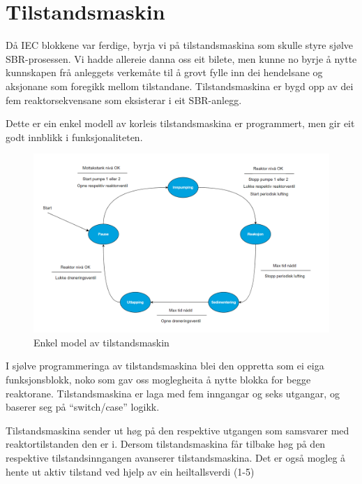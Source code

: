 \section{Tilstandsmaskin}
\thispagestyle{fancy}

Då \gls{IEC} blokkene var ferdige, byrja vi på tilstandsmaskina som skulle styre sjølve \gls{SBR}-prosessen. 
Vi hadde allereie danna oss eit bilete, men kunne no byrje å nytte kunnskapen frå anleggets verkemåte
til å grovt fylle inn dei hendelsane og aksjonane som foregikk mellom tilstandane. 
Tilstandsmaskina er bygd opp av dei fem reaktorsekvensane som eksisterar i eit \gls{SBR}-anlegg.

Dette er ein enkel modell av korleis tilstandsmaskina er programmert, men gir eit godt innblikk i funksjonaliteten. \newline \newline \newline \newline \newline

\begin{figure}[htbp]
    \centering
    \includegraphics[width=1\textwidth]{Figurar/Simpel tilstandsmaskin.png}
    \caption{Enkel model av tilstandsmaskin}\label{fig:SimpelTilstandsmaskin}
\end{figure}


\newpage

I sjølve programmeringa av tilstandsmaskina blei den oppretta som ei eiga funksjonsblokk, noko som gav oss moglegheita å nytte blokka for begge reaktorane.
Tilstandsmaskina er laga med fem inngangar og seks utgangar, og baserer seg på ``switch/case'' logikk.

Tilstandsmaskina sender ut høg på den respektive utgangen som samsvarer med reaktortilstanden den er i. Dersom tilstandsmaskina får tilbake
høg på den respektive tilstandsinngangen avanserer tilstandsmaskina.
Det er også mogleg å hente ut aktiv tilstand ved hjelp av ein heiltallsverdi (1-5) \newline \newline \newline \newline


